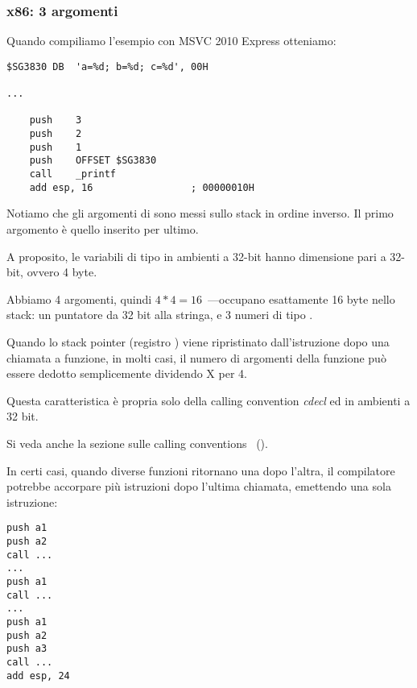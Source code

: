 \subsubsection{x86: 3 argomenti}


Quando compiliamo l'esempio con MSVC 2010 Express otteniamo:

\begin{lstlisting}[style=customasmx86]
$SG3830	DB	'a=%d; b=%d; c=%d', 00H

...

	push	3
	push	2
	push	1
	push	OFFSET $SG3830
	call	_printf
	add	esp, 16					; 00000010H
\end{lstlisting}

Notiamo che gli argomenti di \printf sono messi sullo stack in ordine inverso. Il primo argomento è quello inserito per ultimo.

A proposito, le variabili di tipo \Tint in ambienti a 32-bit hanno dimensione pari a 32-bit, ovvero 4 byte.

Abbiamo 4 argomenti, quindi $4*4 = 16$~---occupano esattamente 16 byte nello stack: un puntatore da 32 bit alla stringa, e 3 numeri di tipo \Tint.

Quando lo \gls{stack pointer} (registro \ESP) viene ripristinato dall'istruzione 
dopo una chiamata a funzione, in molti casi,
il numero di argomenti della funzione può essere dedotto semplicemente dividendo X per 4.

Questa caratteristica è propria solo della calling convention \emph{cdecl} ed in ambienti a 32 bit.

Si veda anche la sezione sulle calling conventions ~().

In certi casi, quando diverse funzioni ritornano una dopo l'altra, il compilatore potrebbe accorpare più istruzioni  dopo l'ultima chiamata, emettendo una sola istruzione:

\begin{lstlisting}[style=customasmx86]
push a1
push a2
call ...
...
push a1
call ...
...
push a1
push a2
push a3
call ...
add esp, 24
\end{lstlisting}

